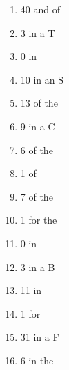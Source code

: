 \documentclass[10pt]{article}
\begin{document}
\begin{enumerate}
    \item 40  and   of
    \item 3  in a   T
    \item 0  in
    \item 10  in an   S
    \item 13  of the
    \item 9  in a   C
    \item 6  of the
    \item 1  of
    \item 7  of the
    \item 1  for the
    \item 0  in
    \item 3  in a   B
    \item 11  in
    \item 1  for
    \item 31  in a   F
    \item 6  in the
\end{enumerate}
\end{document}
